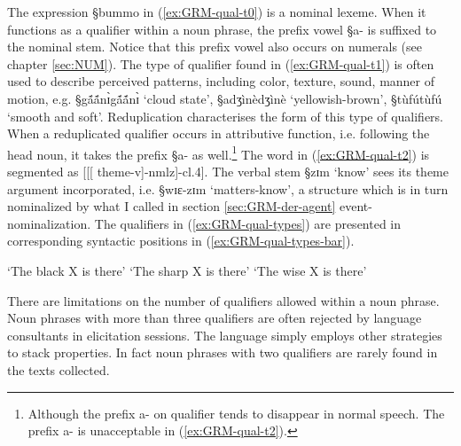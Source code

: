 The expression {\S bummo} in (\ref{ex:GRM-qual-t0}) is a nominal lexeme. When
it functions as a qualifier within a noun phrase,  the prefix vowel {\S a-} is
suffixed to the nominal stem. Notice that this prefix vowel also occurs on
numerals (see chapter \ref{sec:NUM}). The type of qualifier found in
(\ref{ex:GRM-qual-t1}) is often used to
describe perceived patterns, including color, texture, sound, manner of motion,
e.g. {\S gã́ã́nɪ̀gã́ã́nɪ̀} `cloud state',  {\S adʒìnèdʒìnè}
`yellowish-brown',  {\S tùfútùfú} `smooth and soft'. Reduplication
characterises the form of this type of qualifiers. When a reduplicated qualifier
occurs in attributive function, i.e. following the head noun, it takes the
prefix {\S a-} as well.\footnote{Although the prefix {\F a-} on qualifier tends
to disappear in
normal speech. The prefix {\F a-} is unacceptable in (\ref{ex:GRM-qual-t2}).}
The word in (\ref{ex:GRM-qual-t2}) is segmented as [[[{\sc
theme}-v]-{\sc nmlz}]-{\sc cl.4}]. The verbal stem {\S zɪm} `know'   sees  its
theme argument incorporated, i.e.  {\S wɪɛ-zɪm} `matters-know',  a structure
which is in turn nominalized by what I called in section \ref{sec:GRM-der-agent}
event-nominalization.  The qualifiers in
(\ref{ex:GRM-qual-types}) are presented 
in corresponding syntactic positions in (\ref{ex:GRM-qual-types-bar}). 



\begin{exe}
 
 \ex\label{ex:GRM-qual-types-bar}
 \begin{xlist}

   `The black X  is
there'
   `The
sharp  X is there'
 `The wise X is
there'
  \end{xlist}
\end{exe}



There are  limitations
on the number of qualifiers allowed within a noun phrase. Noun phrases with 
more than three qualifiers are often rejected by language consultants in
elicitation sessions.  The
language simply employs other strategies to stack properties. In fact noun
phrases with two qualifiers are rarely found in the texts
collected. 

